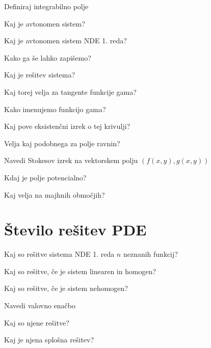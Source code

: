 \documentclass{article}
\begin{document}
\begin{enumerate}
        {\color{blue}\item Definiraj integrabilno polje}
        \item Kaj je avtonomen sistem?
        \item Kaj je avtonomen sistem NDE 1. reda?
        \item Kako ga še lahko zapišemo?
        {\color{red}\item Kaj je rešitev sistema?}
        {\color{blue}\item Kaj torej velja za tangente funkcije gama?}
        {\color{red}\item Kako imenujemo funkcijo gama?}
        {\color{red}\item Kaj pove eksistenčni izrek o tej krivulji?}
        \item Velja kaj podobnega za polje ravnin? 
        {\color{blue}\item Navedi Stokesov izrek na vektorskem polju $(f(x, y), g(x, y))$}
        {\color{blue}\item Kdaj je polje potencialno?}
        \item Kaj velja na majhnih območjih?
    \end{enumerate}

    \section{Število rešitev PDE}
    \begin{enumerate}
        {\color{red}\item Kaj so rešitve sistema NDE 1. reda $n$ neznanih funkcij?}
        {\color{red}\item Kaj so rešitve, če je sistem linearen in homogen?}
        {\color{red}\item Kaj so rešitve, če je sistem nehomogen?}
        \item Navedi valovno enačbo
        \item Kaj so njene rešitve?
        {\color{blue}\item Kaj je njena splošna rešitev?}
    \end{enumerate}
\end{document}
